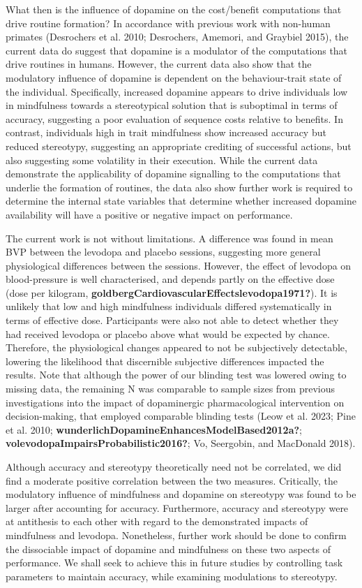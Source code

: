 \documentclass{article}
\begin{document}
What then is the influence of dopamine on the cost/benefit computations
that drive routine formation? In accordance with previous work with
non-human primates (Desrochers et al. 2010; Desrochers, Amemori, and
Graybiel 2015), the current data do suggest that dopamine is a modulator
of the computations that drive routines in humans. However, the current
data also show that the modulatory influence of dopamine is dependent on
the behaviour-trait state of the individual. Specifically, increased
dopamine appears to drive individuals low in mindfulness towards a
stereotypical solution that is suboptimal in terms of accuracy,
suggesting a poor evaluation of sequence costs relative to benefits. In
contrast, individuals high in trait mindfulness show increased accuracy
but reduced stereotypy, suggesting an appropriate crediting of
successful actions, but also suggesting some volatility in their
execution. While the current data demonstrate the applicability of
dopamine signalling to the computations that underlie the formation of
routines, the data also show further work is required to determine the
internal state variables that determine whether increased dopamine
availability will have a positive or negative impact on performance.

The current work is not without limitations. A difference was found in
mean BVP between the levodopa and placebo sessions, suggesting more
general physiological differences between the sessions. However, the
effect of levodopa on blood-pressure is well characterised, and depends
partly on the effective dose (dose per kilogram,
\textbf{goldbergCardiovascularEffectslevodopa1971?}). It is unlikely
that low and high mindfulness individuals differed systematically in
terms of effective dose. Participants were also not able to detect
whether they had received levodopa or placebo above what would be
expected by chance. Therefore, the physiological changes appeared to not
be subjectively detectable, lowering the likelihood that discernible
subjective differences impacted the results. Note that although the
power of our blinding test was lowered owing to missing data, the
remaining N was comparable to sample sizes from previous investigations
into the impact of dopaminergic pharmacological intervention on
decision-making, that employed comparable blinding tests (Leow et al.
2023; Pine et al. 2010;
\textbf{wunderlichDopamineEnhancesModelBased2012a?};
\textbf{volevodopaImpairsProbabilistic2016?}; Vo, Seergobin, and
MacDonald 2018).

Although accuracy and stereotypy theoretically need not be correlated,
we did find a moderate positive correlation between the two measures.
Critically, the modulatory influence of mindfulness and dopamine on
stereotypy was found to be larger after accounting for accuracy.
Furthermore, accuracy and stereotypy were at antithesis to each other
with regard to the demonstrated impacts of mindfulness and levodopa.
Nonetheless, further work should be done to confirm the dissociable
impact of dopamine and mindfulness on these two aspects of performance.
We shall seek to achieve this in future studies by controlling task
parameters to maintain accuracy, while examining modulations to
stereotypy.
\end{document}
